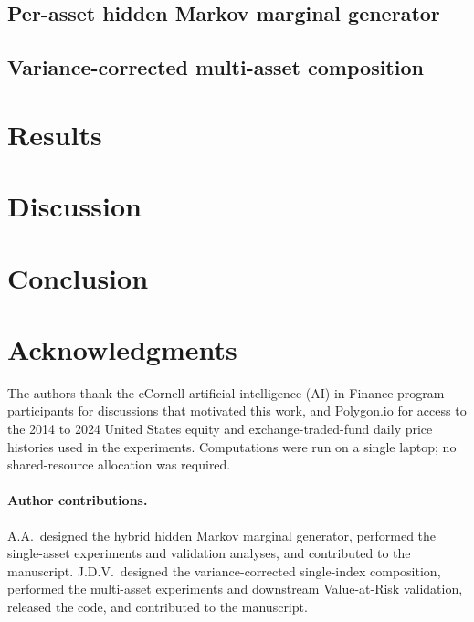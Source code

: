 \documentclass{article}
\theoremstyle{definition}
\theoremstyle{remark}
\begin{document}
\subsection{Per-asset hidden Markov marginal generator}\label{sec:method-hmm}


\subsection{Variance-corrected multi-asset composition}\label{sec:method-sim}


\section{Results}\label{sec:results}


\section{Discussion}\label{sec:discussion}


\section{Conclusion}\label{sec:conclusion}


\section*{Acknowledgments}
The authors thank the eCornell artificial intelligence (AI) in Finance program participants for
discussions that motivated this work,
and Polygon.io for access to the 2014 to 2024 United States equity and
exchange-traded-fund daily
price histories used in the experiments. Computations were run on a
single laptop; no shared-resource allocation was required.

\paragraph{Author contributions.}
A.A.\ designed the hybrid hidden Markov marginal generator, performed the
single-asset experiments and validation analyses, and contributed to the
manuscript. J.D.V.\ designed the variance-corrected single-index
composition, performed the multi-asset experiments and downstream
Value-at-Risk validation, released the code, and contributed to the
manuscript.
\end{document}
